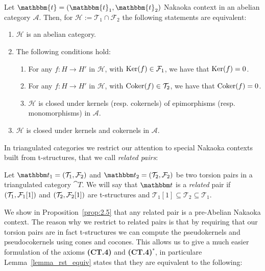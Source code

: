\begin{nonlisting_thm}[\ref{thm_2_4}]
  Let $\mathbbm{t}=(\mathbbm{t}_1,\mathbbm{t}_2)$ Nakaoka context in an abelian category
  $\mathscr{A}$. Then, for
  $\mathcal{H}:=\mathcal{T}_1\cap\mathcal{F}_2$ the following statements are equivalent:
  \begin{enumerate}[label=(\alph*)]
    \item $\mathcal{H}$ is an abelian category.
    \item The following conditions hold:
      \begin{enumerate}[label=(\alph{enumi}\arabic*)]
        \item For any $f:H\to H'$ in $\mathcal{H}$, with $\operatorname{Ker}(f)\in\mathcal{F}_1$,
        we have that $\operatorname{Ker}(f)=0$.
        \item For any $f:H\to H'$ in $\mathcal{H}$, with $\operatorname{Coker}(f)\in\mathcal{T}_2$,
        we have that $\operatorname{Coker}(f)=0$.
        \item $\mathcal{H}$ is closed under kernels (resp. cokernels) of epimorphisms
        (resp. monomorphisms) in $\mathscr{A}$.
      \end{enumerate}
    \item $\mathcal{H}$ is closed under kernels and cokernels in $\mathscr{A}$.
  \end{enumerate}
\end{nonlisting_thm}

In triangulated categories we restrict our attention to special Nakaoka contexts built from t-structures, that we call \emph{related pairs}:
\begin{nonlisting_def}[\ref{def:related_pair}]
  Let $\t_1=(\T_1,\F_2)$ and $\t_2=(\T_2,\F_2)$ be two torsion pairs in a triangulated category $\cat{T}$.
  We will say that $\t$ is a \emph{related} pair if $(\mathcal{T}_1,\mathcal{F}_1[1])$ and $(\mathcal{T}_2,\mathcal{F}_2[1])$ are t-structures and
  $\mathcal{T}_1[1]\subseteq \mathcal{T}_2\subseteq\mathcal{T}_1$.
\end{nonlisting_def}

We show in Proposition~\ref{prop:2.5} that any related pair is a pre-Abelian Nakaoka context. The reason why we restrict to related pairs is that by requiring that our torsion pairs are in fact t-structures we can compute the pseudokernels and pseudocokernels using cones and cocones. This allows us to give a much easier formulation of the axioms \textbf{(CT.4)} and \textbf{(CT.4)$^\ast$}, in particulare Lemma~\ref{lemma_rst_equiv} states that they are equivalent to the following:

